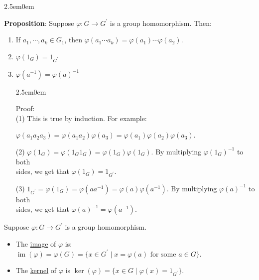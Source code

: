 \documentclass{book}
\newcommand{\hTwo}{%
\color{MidnightBlue}%
   \fontsize{13}{15}\selectfont%
}
\newcommand{\hThree}{%
   \color{PineGreen!85!Orange}
   \fontsize{12}{14}\selectfont%
}
\newenvironment{myIndent}{%
   \begin{adjustwidth}{2.5em}{0em}%
}{%
   \end{adjustwidth}%
}
\newcommand{\udefine}[1]{{%
   \setulcolor{Red}%
   \setul{0.14em}{0.07em}%
   \ul{#1}%
}}
\newcommand{\blab}[1]{\textbf{#1}}
\DeclareMathOperator{\im}{im}
\newcommand{\retTwo}{\hfill\bigbreak}
\begin{document}
\begin{myIndent}\hTwo
	\blab{Proposition}: Suppose $\varphi: G \longrightarrow G^\prime$ is a group homomorphism. Then:
	\begin{enumerate}
		\item If $a_1, \cdots, a_k \in G_1$, then $\varphi(a_1\cdots a_k)=\varphi(a_1)\cdots\varphi(a_2)$.
		\item $\varphi(1_G) = 1_{G^\prime}$
		\item $\varphi(a^{-1}) = \varphi(a)^{-1}$
		
		\begin{myIndent}\hThree
			Proof:\\
			(1) This is true by induction. For example:
			
			{\centering $\varphi(a_1a_2a_3) = \varphi(a_1a_2)\varphi(a_3) = \varphi(a_1)\varphi(a_2)\varphi(a_3)$.\retTwo\par}

			(2) $\varphi(1_G) = \varphi(1_{G}1_{G}) = \varphi(1_G)\varphi(1_G)$. By multiplying $\varphi(1_G)^{-1}$ to both\\ sides, we  get that $\varphi(1_G) = 1_{G^\prime}$.\retTwo

			(3) $1_{G^\prime} = \varphi(1_G) = \varphi(aa^{-1}) = \varphi(a)\varphi(a^{-1})$. By multiplying $\varphi(a)^{-1}$ to both\\ sides, we get that $\varphi(a)^{-1} = \varphi(a^{-1})$.\newpage
		\end{myIndent}
	\end{enumerate}
\end{myIndent}

Suppose $\varphi: G \longrightarrow G^\prime$ is a group homomorphism. 
\begin{itemize}
	\item The \udefine{image} of $\varphi$ is: $\im(\varphi) = \varphi(G) = \{x \in G^\prime \mid x = \varphi(a) \text{ for some } a \in G\}$.
	\item The \udefine{kernel} of $\varphi$ is $\ker(\varphi) = \{x \in G \mid \varphi(x) = 1_{G^\prime}\}$.\retTwo
\end{itemize}
\end{document}
